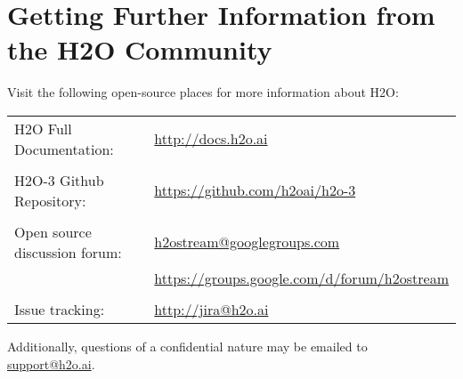 \section{Getting Further Information from the H2O Community}

Visit the following open-source places for more information about H2O:

\begin{tabular}{l l}
H2O Full Documentation: & \url{http://docs.h2o.ai} \\
\\
H2O-3 Github Repository: & \url{https://github.com/h2oai/h2o-3} \\
\\
Open source discussion forum: & \href{mailto:h2ostream@googlegroups.com}{h2ostream@googlegroups.com} \\
& \url{https://groups.google.com/d/forum/h2ostream} \\
\\
Issue tracking: & \url{http://jira@h2o.ai}
\end{tabular}

\bigskip

Additionally, questions of a confidential nature may be emailed to \href{mailto:support@h2o.ai}{support@h2o.ai}.

